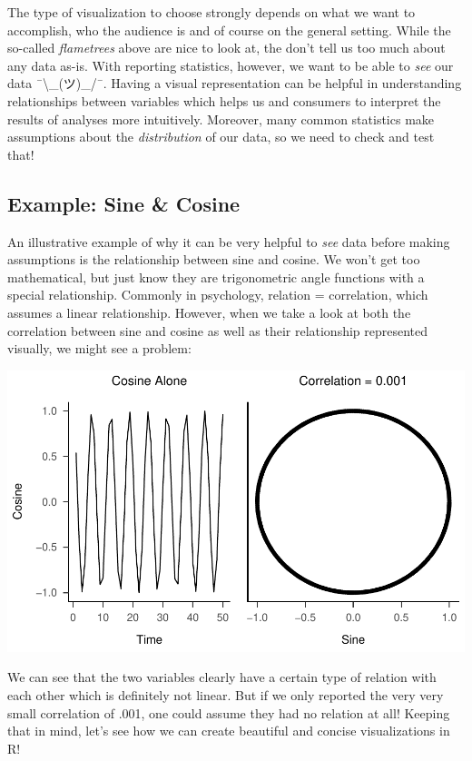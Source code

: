 \documentclass[
]{book}
\begin{document}
The type of visualization to choose strongly depends on what we want to accomplish, who the audience is and of course on the general setting.
While the so-called \emph{flametrees} above are nice to look at, the don't tell us too much about any data as-is.
With reporting statistics, however, we want to be able to \emph{see} our data ¯\textbackslash\_(ツ)\_/¯.
Having a visual representation can be helpful in understanding relationships between variables which helps us and consumers to interpret the results of analyses more intuitively.
Moreover, many common statistics make assumptions about the \emph{distribution} of our data, so we need to check and test that!

\subsection{Example: Sine \& Cosine}\label{example-sine-cosine}

An illustrative example of why it can be very helpful to \emph{see} data before making assumptions is the relationship between sine and cosine.
We won't get too mathematical, but just know they are trigonometric angle functions with a special relationship.
Commonly in psychology, relation = correlation, which assumes a linear relationship.
However, when we take a look at both the correlation between sine and cosine as well as their relationship represented visually, we might see a problem:

\includegraphics{_main_files/figure-html/unnamed-chunk-31-1.pdf}

We can see that the two variables clearly have a certain type of relation with each other which is definitely not linear.
But if we only reported the very very small correlation of .001, one could assume they had no relation at all!
Keeping that in mind, let's see how we can create beautiful and concise visualizations in R!
\end{document}
